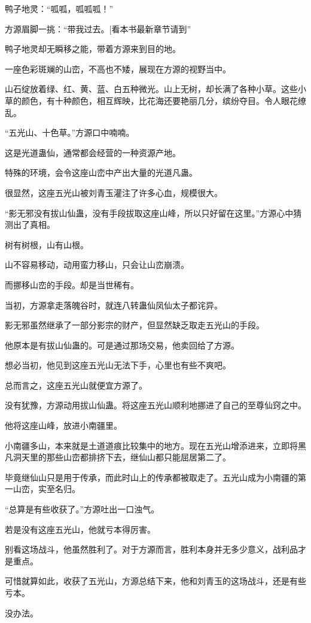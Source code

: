 \begin{this_body}
鸭子地灵：“呱呱，呱呱呱！”

方源眉脚一挑：“带我过去。[看本书最新章节请到”

鸭子地灵却无瞬移之能，带着方源来到目的地。

一座色彩斑斓的山峦，不高也不矮，展现在方源的视野当中。

山石绽放着绿、红、黄、蓝、白五种微光。山上无树，却长满了各种小草。这些小草的颜色，有十种颜色，相互辉映，比花海还要艳丽几分，缤纷夺目。令人眼花缭乱。

“五光山、十色草。”方源口中喃喃。

这是光道蛊仙，通常都会经营的一种资源产地。

特殊的环境，会令这座山峦中产出大量的光道凡蛊。

很显然，这座五光山被刘青玉灌注了许多心血，规模很大。

“影无邪没有拔山仙蛊，没有手段拔取这座山峰，所以只好留在这里。”方源心中猜测出了真相。

树有树根，山有山根。

山不容易移动，动用蛮力移山，只会让山峦崩溃。

而挪移山峦的手段。却是当世稀有。

当初，方源拿走落魄谷时，就连八转蛊仙凤仙太子都诧异。

影无邪虽然继承了一部分影宗的财产，但显然缺乏取走五光山的手段。

他原本是有拔山仙蛊的。可是通过那场交易，他卖回给了方源。

想必当初，他见到这座五光山无法下手，心里也有些不爽吧。

总而言之，这座五光山就便宜方源了。

没有犹豫，方源动用拔山仙蛊。将这座五光山顺利地挪进了自己的至尊仙窍之中。

他将这座山峰，放进小南疆里。

小南疆多山，本来就是土道道痕比较集中的地方。现在五光山增添进来，立即将黑凡洞天里的那些山峦都排挤下去，继仙山都只能屈居第二了。

毕竟继仙山只是用于传承，而此时山上的传承都被取走了。五光山成为小南疆的第一山峦，实至名归。

“总算是有些收获了。”方源吐出一口浊气。

若是没有这座五光山，他就亏本得厉害。

别看这场战斗，他虽然胜利了。对于方源而言，胜利本身并无多少意义，战利品才是重点。

可惜就算如此，收获了五光山，方源总结下来，他和刘青玉的这场战斗，还是有些亏本。

没办法。


\end{this_body}
